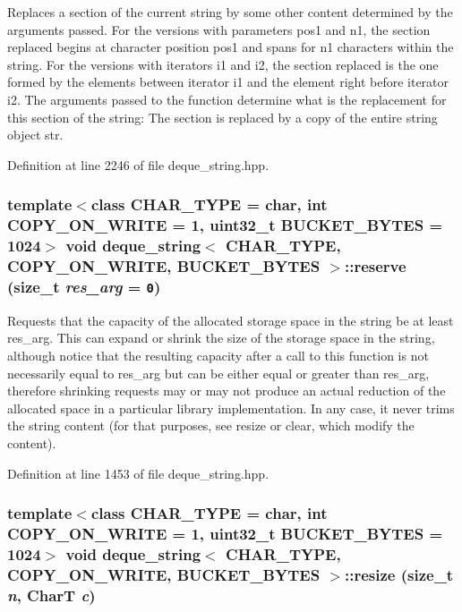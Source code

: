 Replaces a section of the current string by some other content determined by the arguments passed. For the versions with parameters pos1 and n1, the section replaced begins at character position pos1 and spans for n1 characters within the string. For the versions with iterators i1 and i2, the section replaced is the one formed by the elements between iterator i1 and the element right before iterator i2. The arguments passed to the function determine what is the replacement for this section of the string: The section is replaced by a copy of the entire string object str. 

Definition at line 2246 of file deque\_\-string.hpp.\hypertarget{classdeque__string_932f3e6441fcbee5538163dd6d621ea6}{
\subsubsection[{reserve}]{\setlength{\rightskip}{0pt plus 5cm}template$<$class CHAR\_\-TYPE  = char, int COPY\_\-ON\_\-WRITE = 1, uint32\_\-t BUCKET\_\-BYTES = 1024$>$ void {\bf deque\_\-string}$<$ CHAR\_\-TYPE, COPY\_\-ON\_\-WRITE, BUCKET\_\-BYTES $>$::reserve (size\_\-t {\em res\_\-arg} = {\tt 0})}}
\label{classdeque__string_932f3e6441fcbee5538163dd6d621ea6}


Requests that the capacity of the allocated storage space in the string be at least res\_\-arg. This can expand or shrink the size of the storage space in the string, although notice that the resulting capacity after a call to this function is not necessarily equal to res\_\-arg but can be either equal or greater than res\_\-arg, therefore shrinking requests may or may not produce an actual reduction of the allocated space in a particular library implementation. In any case, it never trims the string content (for that purposes, see resize or clear, which modify the content). 

Definition at line 1453 of file deque\_\-string.hpp.\hypertarget{classdeque__string_4a344387975be7a5eebceb58143be0a7}{
\subsubsection[{resize}]{\setlength{\rightskip}{0pt plus 5cm}template$<$class CHAR\_\-TYPE  = char, int COPY\_\-ON\_\-WRITE = 1, uint32\_\-t BUCKET\_\-BYTES = 1024$>$ void {\bf deque\_\-string}$<$ CHAR\_\-TYPE, COPY\_\-ON\_\-WRITE, BUCKET\_\-BYTES $>$::resize (size\_\-t {\em n}, \/  CharT {\em c})}}
\label{classdeque__string_4a344387975be7a5eebceb58143be0a7}


